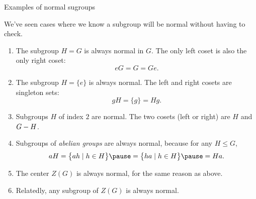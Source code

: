 \documentclass[8pt, handout]{beamer}
\newcommand{\Pause}{\pause}      %
\begin{document}
\begin{frame}{Examples of normal sugroups}
  
  We've seen cases where we know a subgroup will be normal
  without having to check. \medskip\Pause
  
  \begin{enumerate}
  \item The subgroup $H=G$ is always normal in $G$. \Pause The only left coset is also
    the only right coset:
    \[
    eG=G=Ge.
    \] \vspace{-4mm}\Pause
  \item The subgroup $H=\{e\}$ is always normal. \Pause The left and
    right cosets are singleton sets:
    \[
    gH=\{g\}=Hg.
    \]
    \vspace{-4mm}\Pause
  \item Subgroups $H$ of index $2$ are normal. \Pause The two cosets
    (left or right) are $H$ and $G- H$. \medskip\Pause
  \item Subgroups of \emph{abelian groups} are always normal,
    because for any $H\leq G$, 
    \[
    aH=\big\{ah\mid h\in H\big\}\Pause=\big\{ha\mid h\in H\big\}\Pause=Ha.
    \] \vspace{-4mm}\Pause
  \item The center $Z(G)$ is always normal, for the same reason as above. \Pause
  \item Relatedly, any subgroup of $Z(G)$ is always normal.
  \end{enumerate}
  
\end{frame}

\end{document}
